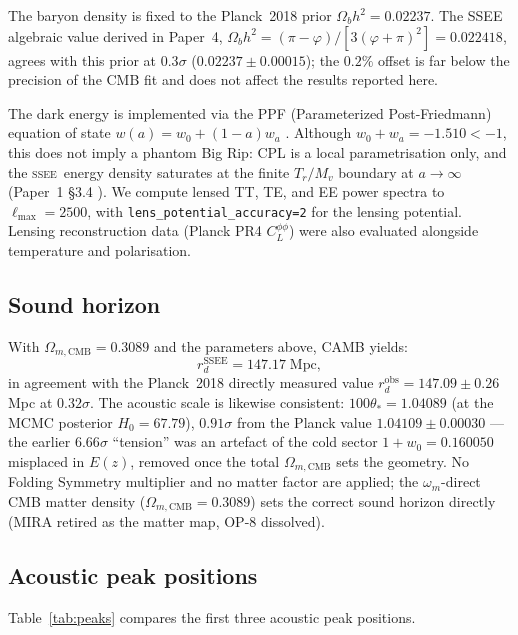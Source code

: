\documentclass[12pt,a4paper]{article}
\newcommand{\SSEE}{\ifmmode\mathrm{SSEE}\else\textsc{ssee}\fi}
\begin{document}
The baryon density is fixed to the Planck~2018 prior $\Omega_b h^2 = 0.02237$.
The SSEE algebraic value derived in Paper~4, $\Omega_b h^2 = (\pi-\varphi)/[3(\varphi+\pi)^2]
= 0.022418$, agrees with this prior at $0.3\sigma$ ($0.02237\pm0.00015$); the $0.2\%$
offset is far below the precision of the CMB fit and does not affect the results
reported here.

The dark energy is implemented via the PPF (Parameterized Post-Friedmann)
equation of state $w(a)=w_0+(1-a)w_a$ \citep{Chevallier2001,Linder2003,Fang2008}.
Although $w_0+w_a=-1.510<-1$, this does not imply a phantom Big Rip:
CPL is a local parametrisation only, and the \SSEE\ energy density saturates
at the finite $T_r/M_v$ boundary at $a\to\infty$ (Paper~1 \S3.4 \citep{AlmeidaSSEE2026a}).
We compute lensed TT, TE, and EE power spectra to $\ell_{\max}=2500$,
with \texttt{lens\_potential\_accuracy=2} for the lensing potential.
Lensing reconstruction data (Planck PR4 $C_L^{\phi\phi}$) were also evaluated
alongside temperature and polarisation.

\subsection{Sound horizon}

With $\Omega_{m,\mathrm{CMB}}=0.3089$ and the parameters above, CAMB yields:
\begin{equation}
r_d^{\mathrm{SSEE}} = 147.17 \;\mathrm{Mpc},
\end{equation}
in agreement with the Planck~2018 directly measured value
$r_d^{\mathrm{obs}}=147.09\pm0.26$ Mpc \citep{Planck2018} at $0.32\sigma$.
The acoustic scale is likewise consistent: $100\theta_*=1.04089$ (at the MCMC
posterior $H_0=67.79$), $0.91\sigma$ from the Planck value
$1.04109\pm0.00030$ --- the earlier $6.66\sigma$ ``tension'' was an artefact of
the cold sector $1+w_0=0.160050$ misplaced in $E(z)$, removed once the total
$\Omega_{m,\mathrm{CMB}}$ sets the geometry.
No Folding Symmetry multiplier and no matter factor are applied; the
$\omega_m$-direct CMB matter density ($\Omega_{m,\mathrm{CMB}}=0.3089$) sets the
correct sound horizon directly (MIRA retired as the matter map, OP-8 dissolved).

\subsection{Acoustic peak positions}

Table~\ref{tab:peaks} compares the first three acoustic peak positions.
\end{document}
